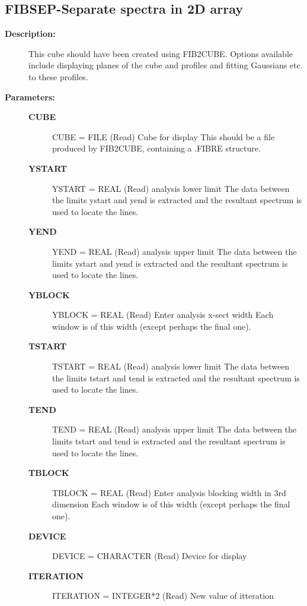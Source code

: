\subsection{FIBSEP-\label{FIBSEP}Separate spectra in 2D array}
\begin{description}

\item [{\bf Description:}]
    This cube should have been created using FIB2CUBE. Options available
    include displaying planes of the cube and profiles and fitting
    Gaussians etc. to these profiles.

\item [{\bf Parameters:}]
\begin{description}
\item [{\bf CUBE}]
    CUBE = FILE (Read)
        Cube for display
          This should be a file produced by FIB2CUBE, containing
          a .FIBRE structure.
\item [{\bf YSTART}]
    YSTART = REAL (Read)
        analysis lower limit
            The data between the limits ystart and yend is extracted
            and the resultant spectrum is used to locate the lines.
\item [{\bf YEND}]
    YEND = REAL (Read)
        analysis upper limit
            The data between the limits ystart and yend is extracted
            and the resultant spectrum is used to locate the lines.
\item [{\bf YBLOCK}]
    YBLOCK = REAL (Read)
        Enter analysis x-sect width
            Each window is of this width (except perhaps the final one).
\item [{\bf TSTART}]
    TSTART = REAL (Read)
        analysis lower limit
            The data between the limits tstart and tend is extracted
            and the resultant spectrum is used to locate the lines.
\item [{\bf TEND}]
    TEND = REAL (Read)
        analysis upper limit
            The data between the limits tstart and tend is extracted
            and the resultant spectrum is used to locate the lines.
\item [{\bf TBLOCK}]
    TBLOCK = REAL (Read)
        Enter analysis blocking width in 3rd dimension
            Each window is of this width (except perhaps the final one).
\item [{\bf DEVICE}]
    DEVICE = CHARACTER (Read)
        Device for display
\item [{\bf ITERATION}]
    ITERATION = INTEGER*2 (Read)
        New value of itteration

\end{description}
\end{description}
